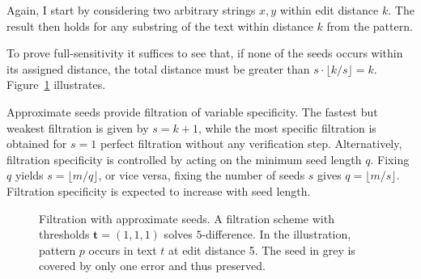 Again, I start by considering two arbitrary strings $x,y$ within edit distance $k$.
The result then holds for any substring of the text within distance $k$ from the pattern.
To prove full-sensitivity it suffices to see that, if none of the seeds occurs within its assigned distance, the total distance must be greater than $s \cdot \lfloor k/s \rfloor = k$.
Figure~\ref{fig:seeds-apx} illustrates.

Approximate seeds provide filtration of variable specificity.
The fastest but weakest filtration is given by $s=k+1$, while the most specific filtration is obtained for $s=1$ \ie perfect filtration without any verification step.
Alternatively, filtration specificity is controlled by acting on the minimum seed length $q$.
Fixing $q$ yields $s = \lfloor m/q \rfloor$, or vice versa, fixing the number of seeds $s$ gives $q =\lfloor m/s \rfloor$.
Filtration specificity is expected to increase with seed length.

\begin{figure}[h]
\begin{center}
\caption[Filtration with approximate seeds]{Filtration with approximate seeds. A filtration scheme with thresholds $\mathbf{t} = (1,1,1)$ solves $5$-difference. In the illustration, pattern $p$ occurs in text $t$ at edit distance 5. The seed in grey is covered by only one error and thus preserved.}
\label{fig:seeds-apx}

\end{center}
\end{figure}


